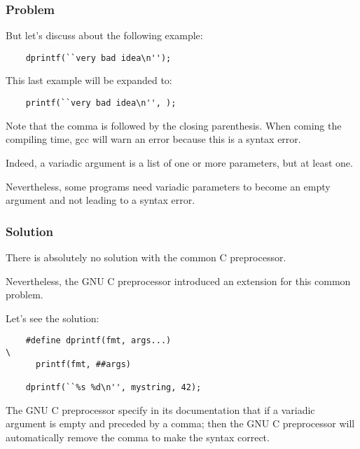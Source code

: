 
\begin{frame}[containsverbatim]
  \frametitle{Problem}

  But let's discuss about the following example:

  \begin{verbatim}
    dprintf(``very bad idea\n'');
  \end{verbatim}

  This last example will be expanded to:

  \begin{verbatim}
    printf(``very bad idea\n'', );
  \end{verbatim}

  Note that the comma is followed by the closing parenthesis. When coming
  the compiling time, gcc will warn an error because this is a syntax
  error.

  \nl

  Indeed, a variadic argument is a list of one or more parameters, but at
  least one.

  \nl

  Nevertheless, some programs need variadic parameters to become an empty
  argument and not leading to a syntax error.
\end{frame}


\begin{frame}[containsverbatim]
  \frametitle{Solution}

  There is absolutely no solution with the common C preprocessor.

  \nl

  Nevertheless, the GNU C preprocessor introduced an extension for
  this common problem.

  \nl

  Let's see the solution:

  \begin{verbatim}
    #define dprintf(fmt, args...)                                       \
      printf(fmt, ##args)

    dprintf(``%s %d\n'', mystring, 42);
  \end{verbatim}

  The GNU C preprocessor specify in its documentation that if a variadic
  argument is empty and preceded by a comma; then the GNU C preprocessor will
  automatically remove the comma to make the syntax correct.
\end{frame}

%
%

